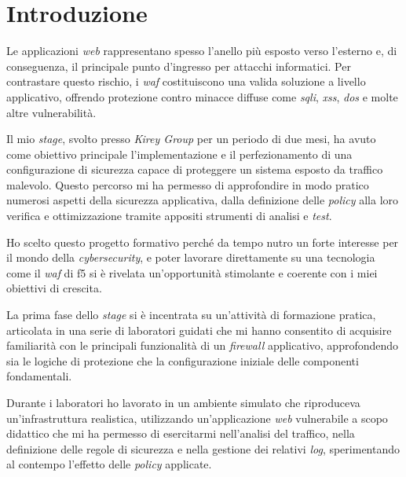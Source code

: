 %     
%     
%     

\chapter{Introduzione}
\label{cap:1introduzione}

Le applicazioni \emph{web} rappresentano spesso l'anello più esposto verso l'esterno e, di conseguenza, il principale punto d'ingresso per attacchi informatici. Per contrastare questo rischio, i \emph{\gls{waf}} costituiscono una valida soluzione a livello applicativo, offrendo protezione contro minacce diffuse come \emph{\gls{sqli}}, \emph{\gls{xss}}, \emph{\gls{dos}} e molte altre vulnerabilità.

Il mio \emph{stage}, svolto presso \emph{Kirey Group} per un periodo di due mesi, ha avuto come obiettivo principale l'implementazione e il perfezionamento di una configurazione di sicurezza capace di proteggere un sistema esposto da traffico malevolo. Questo percorso mi ha permesso di approfondire in modo pratico numerosi aspetti della sicurezza applicativa, dalla definizione delle \emph{\gls{policy}} alla loro verifica e ottimizzazione tramite appositi strumenti di analisi e \emph{test}.

Ho scelto questo progetto formativo perché da tempo nutro un forte interesse per il mondo della \emph{cybersecurity}, e poter lavorare direttamente su una tecnologia come il \emph{\gls{waf}} di \gls{f5} si è rivelata un'opportunità stimolante e coerente con i miei obiettivi di crescita.

La prima fase dello \emph{stage} si è incentrata su un'attività di formazione pratica, articolata in una serie di laboratori guidati che mi hanno consentito di acquisire familiarità con le principali funzionalità di un \emph{\gls{firewall}} applicativo, approfondendo sia le logiche di protezione che la configurazione iniziale delle componenti fondamentali.

Durante i laboratori ho lavorato in un ambiente simulato che riproduceva un'infrastruttura realistica, utilizzando un'applicazione \emph{web} vulnerabile a scopo didattico che mi ha permesso di esercitarmi nell'analisi del traffico, nella definizione delle regole di sicurezza e nella gestione dei relativi \emph{\gls{log}}, sperimentando al contempo l'effetto delle \emph{\gls{policy}} applicate.

